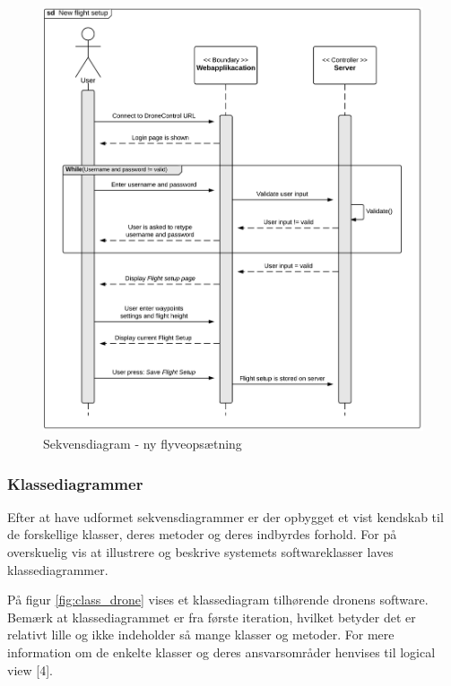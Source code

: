  
\begin{figure}[H]
	\centering
	\includegraphics[width=1\textwidth]{Billeder/sekvens.png}
	\vspace{-0.6cm}	
	\caption{Sekvensdiagram - ny flyveopsætning}
	\label{fig:login_flysetting}
\end{figure}

\newpage
\subsubsection*{Klassediagrammer}
\vspace{-0.3cm}	

Efter at have udformet sekvensdiagrammer er der opbygget et vist kendskab til de forskellige klasser, deres metoder og deres indbyrdes forhold. For på overskuelig vis at illustrere og beskrive systemets softwareklasser laves klassediagrammer.

På figur \ref{fig:class_drone} vises et klassediagram tilhørende dronens software. Bemærk at klassediagrammet er fra første iteration, hvilket betyder det er relativt lille og ikke indeholder så mange klasser og metoder. For mere information om de enkelte klasser og deres ansvarsområder henvises til logical view [4].

